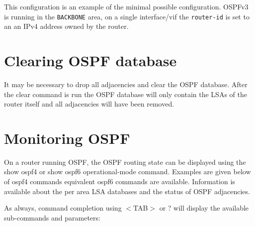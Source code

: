This configuration is an example of the minimal possible
configuration. OSPFv3 is running in the {\tt BACKBONE} area, on a single
interface/vif the {\tt router-id} is set to an an IPv4 address owned
by the router.

\newpage
\section{Clearing OSPF database}

It may be necessary to drop all adjacencies and clear the OSPF
database. After the clear command is run the OSPF database will only
contain the LSAs of the router itself and all adjacencies will have been
removed.

\vspace{0.1in}
\noindent{}

\newpage
\section{Monitoring OSPF}

On a router running OSPF, the OSPF routing state can be displayed
using the {\stt show ospf4} or {\stt show ospf6} operational-mode
command. Examples are given below of ospf4 commands equivalent ospf6
commands are available. Information is available about the per area
LSA databases and the status of OSPF adjacencies.

As always, command completion using $<$TAB$>$ or ? will display the
available sub-commands and parameters:

\vspace{0.1in}
\noindent{}

